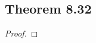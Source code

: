 \documentclass[../../main.tex]{subfiles}
\begin{document}
\subsection{Theorem 8.32}
\begin{wts}

\end{wts}
\begin{proof}

\end{proof}
\end{document}
